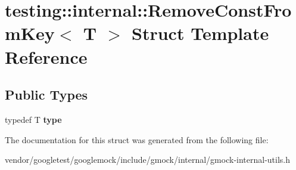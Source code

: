 \hypertarget{structtesting_1_1internal_1_1RemoveConstFromKey}{}\section{testing\+:\+:internal\+:\+:Remove\+Const\+From\+Key$<$ T $>$ Struct Template Reference}
\label{structtesting_1_1internal_1_1RemoveConstFromKey}
\subsection*{Public Types}
\begin{DoxyCompactItemize}
\item 
typedef T {\bfseries type}\hypertarget{structtesting_1_1internal_1_1RemoveConstFromKey_ab657b0a0fe4ebc499d27011f73c794c1}{}\label{structtesting_1_1internal_1_1RemoveConstFromKey_ab657b0a0fe4ebc499d27011f73c794c1}

\end{DoxyCompactItemize}


The documentation for this struct was generated from the following file\+:\begin{DoxyCompactItemize}
\item 
vendor/googletest/googlemock/include/gmock/internal/gmock-\/internal-\/utils.\+h\end{DoxyCompactItemize}
